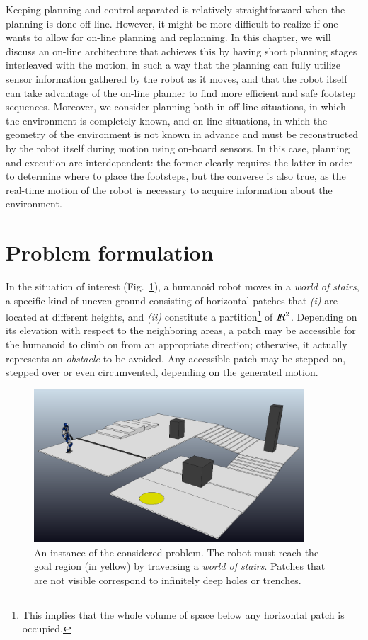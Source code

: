 Keeping planning and control separated is relatively straightforward when the
planning is done off-line. However, it might be more difficult to realize if
one wants to allow for on-line planning and replanning. In this chapter,
we will discuss an on-line architecture that achieves this by having short
planning stages interleaved with the motion, in such a way that the planning
can fully utilize sensor information gathered by the robot as it moves, and
that the robot itself can take advantage of the on-line planner to find more
efficient and safe footstep sequences.
Moreover, we consider planning both in off-line situations, in which the
environment is completely known, and on-line situations, in which the geometry
of the environment is not known in advance and must be reconstructed by the
robot itself during motion using on-board sensors. In this case, planning and
execution are interdependent: the former clearly requires the latter in order
to determine where to place the footsteps, but the converse is also true, as the
real-time motion of the robot is necessary to acquire information about the
environment.
	
\section{Problem formulation}
\label{sec:WoS:Formulation}
In the situation of interest (Fig.~\ref{fig:WoS:WoSScenario}), a humanoid robot
moves in a {\em world of stairs}, a specific kind of uneven ground consisting of
horizontal patches that {\em (i)} are located at different heights, and
{\em (ii)} constitute a partition\footnote{This implies that the whole
volume of space below any horizontal patch is occupied.} of ${I\!\!R}^2$. 
Depending on its elevation with respect to the neighboring areas, a patch may
be accessible for the humanoid to climb on from an appropriate direction;
otherwise, it actually represents an {\em obstacle} to be avoided.
Any accessible patch may be stepped on, stepped over or even circumvented,
depending on the generated motion.  

\begin{figure}
    \centering
    \includegraphics[width=0.9\textwidth]{figures/WoS_Scenario.PNG}
    \caption{An instance of the considered problem. The robot must reach the
        goal region (in yellow) by traversing a {\em world of stairs}.
        Patches that are not visible correspond to infinitely deep holes or
        trenches.}
    \label{fig:WoS:WoSScenario}
\end{figure}

